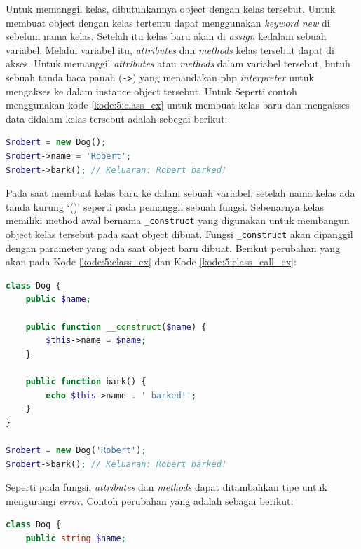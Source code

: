 \documentclass[a4paper,twoside]{article}
\begin{document}
\begin{enumerate}
\begin{itemize}
		            Untuk memanggil kelas, dibutuhkannya object dengan kelas tersebut.  Untuk membuat object dengan kelas tertentu dapat menggunakan \textit{keyword new} di sebelum nama kelas. Setelah itu kelas baru akan di \textit{assign} kedalam sebuah variabel. Melalui variabel itu, \textit{attributes} dan \textit{methods} kelas tersebut dapat di akses.
		            Untuk memanggil \textit{attributes} atau \textit{methods} dalam variabel tersebut, butuh sebuah tanda baca panah (\verb|->|) yang menandakan php \textit{interpreter} untuk mengakses ke dalam instance object tersebut. Untuk
		            Seperti contoh menggunakan kode \ref{kode:5:class_ex} untuk membuat kelas baru dan mengakses data didalam kelas tersebut adalah sebegai berikut:

		            \begin{lstlisting}[language={php}, caption={Contoh Pemanggilan Kelas}, label={kode:5:class_call_ex}]
$robert = new Dog();
$robert->name = 'Robert';
$robert->bark(); // Keluaran: Robert barked!
					\end{lstlisting}

		            Pada saat membuat kelas baru ke dalam sebuah variabel, setelah nama kelas ada tanda kurung `()' seperti pada pemanggil sebuah fungsi. Sebenarnya kelas memiliki method awal bernama \verb|_construct| yang digunakan untuk membangun object kelas tersebut pada saat object dibuat. Fungsi \verb|_construct| akan dipanggil dengan parameter yang ada saat object baru dibuat. Berikut perubahan yang akan pada Kode \ref{kode:5:class_ex} dan Kode \ref{kode:5:class_call_ex}:

		            \begin{lstlisting}[language={php}, caption={Contoh Kelas}, label={kode:5:class_ex}]
class Dog {
	public $name;
	
	public function __construct($name) {
        $this->name = $name;
  	}
	
	public function bark() {
		echo $this->name . ' barked!';
	}
}

$robert = new Dog('Robert');
$robert->bark(); // Keluaran: Robert barked!
					\end{lstlisting}

		            Seperti pada fungsi, \textit{attributes} dan \textit{methods} dapat ditambahkan tipe untuk mengurangi \textit{error}. Contoh perubahan yang adalah sebagai berikut:

		            \begin{lstlisting}[language={php}, caption={Contoh Kelas}, label={kode:5:class_ex}]
class Dog {
	public string $name;
	

\end{lstlisting}
\end{itemize}
\end{enumerate}
\end{document}
